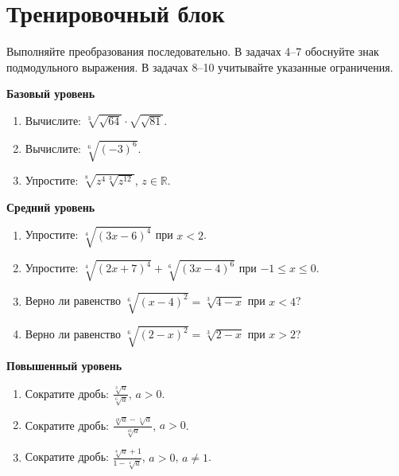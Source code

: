 \documentclass[a4paper,12pt]{article}
\begin{document}
\section*{Тренировочный блок}
Выполняйте преобразования последовательно. В задачах 4--7 обоснуйте знак подмодульного выражения. В задачах 8--10 учитывайте указанные ограничения.\par\medskip
\textcolor{darkaccent}{\textbf{Базовый уровень}}
\begin{enumerate}
\item Вычислите: $\displaystyle \sqrt[3]{\sqrt{64}}\cdot\sqrt{\sqrt{81}}$.
\item Вычислите: $\displaystyle \sqrt[6]{(-3)^6}$.
\item Упростите: $\displaystyle \sqrt[8]{z^4\sqrt[3]{z^{12}}}$, $z\in\mathbb R$.
\end{enumerate}
\textcolor{darkaccent}{\textbf{Средний уровень}}
\begin{enumerate}[resume]
\item Упростите: $\displaystyle \sqrt[4]{(3x-6)^4}$ при $x<2$.
\item Упростите: $\displaystyle \sqrt[4]{(2x+7)^4}+\sqrt[6]{(3x-4)^6}$ при $-1\le x\le0$.
\item Верно ли равенство $\displaystyle \sqrt[6]{(x-4)^2}=\sqrt[3]{4-x}$ при $x<4$?
\item Верно ли равенство $\displaystyle \sqrt[6]{(2-x)^2}=\sqrt[3]{2-x}$ при $x>2$?
\end{enumerate}
\textcolor{darkaccent}{\textbf{Повышенный уровень}}
\begin{enumerate}[resume]
\item Сократите дробь: $\displaystyle \frac{\sqrt[3]a}{\sqrt[6]a}$, $a>0$.
\item Сократите дробь: $\displaystyle \frac{\sqrt[10]a-\sqrt[5]a}{\sqrt[10]a}$, $a>0$.
\item Сократите дробь: $\displaystyle \frac{\sqrt[8]a+1}{1-\sqrt[4]a}$, $a>0$, $a\ne1$.
\end{enumerate}
\clearpage
\end{document}
